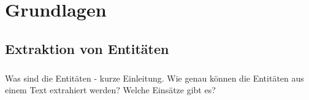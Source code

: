 \chapter{Grundlagen}
\label{sec:Grundlagen}

\section{Extraktion von Entitäten}
\paragraph{}
Was sind die Entitäten - kurze Einleitung. Wie genau können die Entitäten aus einem Text extrahiert werden? Welche Einsätze gibt es?



